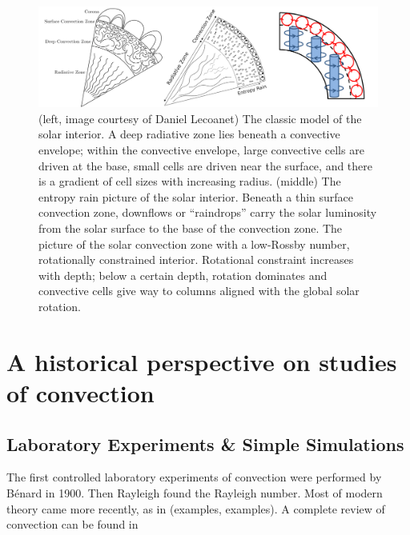\begin{figure}[ht!]
\includegraphics[width=\textwidth]{./figs/intro/conundrum_explanations.pdf}
\caption[Solar velocity power spectra.]
{
	(left, image courtesy of Daniel Lecoanet) The classic model of the solar interior.
	A deep radiative zone lies beneath a convective envelope; within the convective envelope, large convective cells are driven at the base, small cells are driven near the surface, and there is a gradient of cell sizes with increasing radius.
	(middle) The entropy rain picture of the solar interior.
	Beneath a thin surface convection zone, downflows or ``raindrops'' carry the solar luminosity from the solar surface to the base of the convection zone. 
	\citep[right, Fig.~3c of][]{featherstone&hindman2016b} The picture of the solar convection zone with a low-Rossby number, rotationally constrained interior.
	Rotational constraint increases with depth; below a certain depth, rotation dominates and convective cells give way to columns aligned with the global solar rotation.
	\label{fig:asteroseismology} 
}
\end{figure}




\section{A historical perspective on studies of convection}



\subsection{Laboratory Experiments \& Simple Simulations}
The first controlled laboratory experiments of convection were performed by B\'{e}nard in 1900.
Then Rayleigh found the Rayleigh number.
Most of modern theory came more recently, as in (examples, examples).
A complete review of \RB convection can be found in \citet{siggia1994}


